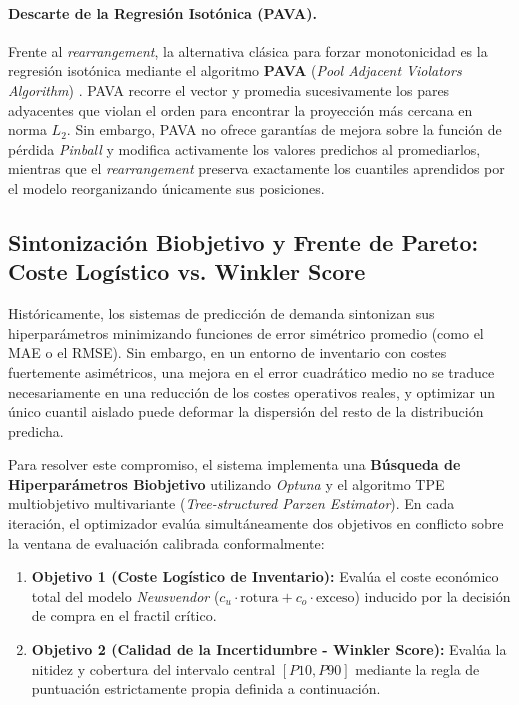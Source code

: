 \paragraph{Descarte de la Regresión Isotónica (PAVA).}
Frente al \textit{rearrangement}, la alternativa clásica para forzar monotonicidad es la regresión isotónica mediante el algoritmo \textbf{PAVA} (\textit{Pool Adjacent Violators Algorithm}) \cite{barlow1972isotonic}. PAVA recorre el vector y promedia sucesivamente los pares adyacentes que violan el orden para encontrar la proyección más cercana en norma $L_2$. Sin embargo, PAVA no ofrece garantías de mejora sobre la función de pérdida \textit{Pinball} y modifica activamente los valores predichos al promediarlos, mientras que el \textit{rearrangement} preserva exactamente los cuantiles aprendidos por el modelo reorganizando únicamente sus posiciones.

\subsection{Sintonización Biobjetivo y Frente de Pareto: Coste Logístico vs. Winkler Score}
\label{sec:tuning_metodologia}
\label{sec:pareto}

Históricamente, los sistemas de predicción de demanda sintonizan sus hiperparámetros minimizando funciones de error simétrico promedio (como el MAE o el RMSE). Sin embargo, en un entorno de inventario con costes fuertemente asimétricos, una mejora en el error cuadrático medio no se traduce necesariamente en una reducción de los costes operativos reales, y optimizar un único cuantil aislado puede deformar la dispersión del resto de la distribución predicha.

Para resolver este compromiso, el sistema implementa una \textbf{Búsqueda de Hiperparámetros Biobjetivo} utilizando \textit{Optuna} \cite{akiba2019optuna} y el algoritmo TPE multiobjetivo multivariante (\textit{Tree-structured Parzen Estimator}). En cada iteración, el optimizador evalúa simultáneamente dos objetivos en conflicto sobre la ventana de evaluación calibrada conformalmente:

\begin{enumerate}
    \item \textbf{Objetivo 1 (Coste Logístico de Inventario):} Evalúa el coste económico total del modelo \textit{Newsvendor} ($c_u \cdot \text{rotura} + c_o \cdot \text{exceso}$) inducido por la decisión de compra en el fractil crítico.
    \item \textbf{Objetivo 2 (Calidad de la Incertidumbre - Winkler Score):} Evalúa la nitidez y cobertura del intervalo central $[P10, P90]$ mediante la regla de puntuación estrictamente propia definida a continuación.
\end{enumerate}

